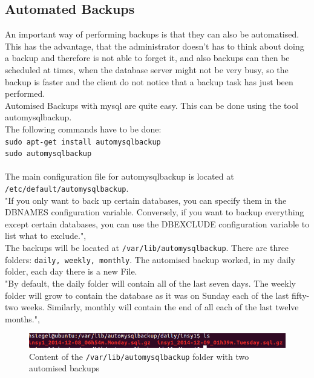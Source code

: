 \documentclass[10pt]{article}
\begin{document}
\subsection{Automated Backups}
An important way of performing backups is that they can also be automatised. This has the advantage, that the administrator doesn't has to think about doing a backup and therefore is not able to forget it, and also backups can then be scheduled at times, when the database server might not be very busy, so the backup is faster and the client do not notice that a backup task has just been performed.  \\
Automised Backups with mysql are quite easy. This can be done using the tool automysqlbackup. \\
The following commands have to be done: \\
\texttt{sudo apt-get install automysqlbackup} \\
\texttt{sudo automysqlbackup} \\ \\
The main configuration file for automysqlbackup is located at \texttt{/etc/default/automysqlbackup}. \\
"If you only want to back up certain databases, you can specify them in the DBNAMES configuration variable. Conversely, if you want to backup everything except certain databases, you can use the DBEXCLUDE configuration variable to list what to exclude.",\cite{sceduleddbbck} \\
The backups will be located at \texttt{/var/lib/automysqlbackup}. There are three folders: \texttt{daily, weekly, monthly}.
The automised backup worked, in my daily folder, each day there is a new File.\\
"By default, the daily folder will contain all of the last seven days. The weekly folder will grow to contain the database as it was on Sunday each of the last fifty-two weeks. Similarly, monthly will contain the end of all each of the last twelve months.",\cite{sceduleddbbck}
\begin{figure}[!h]
	\begin{center}
		\includegraphics[width=0.5\linewidth]{pictures/mysql_autobackup}
		\caption{Content of the \texttt{/var/lib/automysqlbackup} folder with two automised backups}
		\label{content}
	\end{center}
\end{figure}
\FloatBarrier
\end{document}
